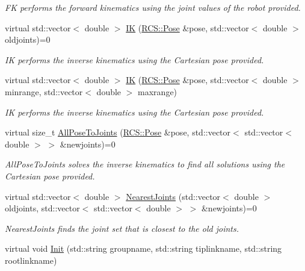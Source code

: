 \begin{DoxyCompactItemize}
\begin{DoxyCompactList}\small\item\em F\-K performs the forward kinematics using the joint values of the robot provided. \end{DoxyCompactList}\item 
virtual std\-::vector$<$ double $>$ \hyperlink{classIKinematics_ad0715c776a7eb325d2543bc34fa8114f}{I\-K} (\hyperlink{namespaceRCS_aa07e45d8a50e30064283d2b38087f999}{R\-C\-S\-::\-Pose} \&pose, std\-::vector$<$ double $>$ oldjoints)=0
\begin{DoxyCompactList}\small\item\em I\-K performs the inverse kinematics using the Cartesian pose provided. \end{DoxyCompactList}\item 
virtual std\-::vector$<$ double $>$ \hyperlink{classIKinematics_a2b5554a09667fa0b985f3954306841ea}{I\-K} (\hyperlink{namespaceRCS_aa07e45d8a50e30064283d2b38087f999}{R\-C\-S\-::\-Pose} \&pose, std\-::vector$<$ double $>$ minrange, std\-::vector$<$ double $>$ maxrange)
\begin{DoxyCompactList}\small\item\em I\-K performs the inverse kinematics using the Cartesian pose provided. \end{DoxyCompactList}\item 
virtual size\-\_\-t \hyperlink{classIKinematics_aeb53bb4b2a1e70a79d5d724e5eb82c10}{All\-Pose\-To\-Joints} (\hyperlink{namespaceRCS_aa07e45d8a50e30064283d2b38087f999}{R\-C\-S\-::\-Pose} \&pose, std\-::vector$<$ std\-::vector$<$ double $>$ $>$ \&newjoints)=0
\begin{DoxyCompactList}\small\item\em All\-Pose\-To\-Joints solves the inverse kinematics to find all solutions using the Cartesian pose provided. \end{DoxyCompactList}\item 
virtual std\-::vector$<$ double $>$ \hyperlink{classIKinematics_ab74b70ed6ecc53adfc36505b8dd1fef4}{Nearest\-Joints} (std\-::vector$<$ double $>$ oldjoints, std\-::vector$<$ std\-::vector$<$ double $>$ $>$ \&newjoints)=0
\begin{DoxyCompactList}\small\item\em Nearest\-Joints finds the joint set that is closest to the old joints. \end{DoxyCompactList}\item 
virtual void \hyperlink{classIKinematics_a87e475cccc5834a5ed6dc846af6ee6ed}{Init} (std\-::string groupname, std\-::string tiplinkname, std\-::string rootlinkname)

\end{DoxyCompactItemize}
